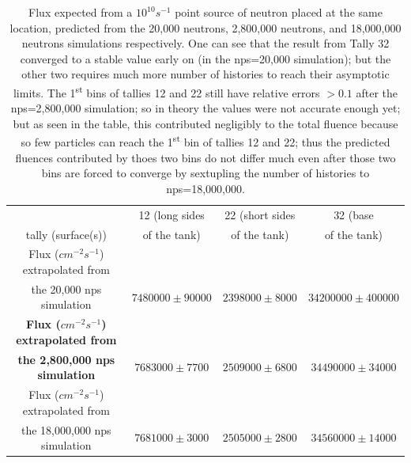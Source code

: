 \documentclass[a4paper, 11pt]{article}
\begin{document}
\begin{appendices}
\begin{table}[H]
	\centering
	\begin{tabular}{c|ccc}
						   & 12 (long sides & 22 (short sides & 32 (base    \\
		tally (surface(s)) &  of the tank) & of the tank) & of the tank)	\\
		\hline
		Flux (${cm}^{-2}s^{-1}$) extrapolated from \\
		the 20,000 nps simulation & $7480000 \pm 90000$ & $2398000 \pm 8000$ & $34200000 \pm 400000$ \\
		\hline
		\textbf{Flux (${cm}^{-2}s^{-1}$) extrapolated from } \\
		\textbf{the 2,800,000 nps simulation} & $7683000\pm7700$& $2509000\pm6800$ & $34490000\pm34000$ \\
		\hline
		Flux (${cm}^{-2}s^{-1}$) extrapolated from \\
		the 18,000,000 nps simulation & $7681000\pm 3000$ & $2505000\pm 2800$ & $34560000\pm 14000$ 
	\end{tabular}
	\caption{Flux expected from a $10^{10} s^{-1}$ point source of neutron placed at the same location, predicted from the 20,000 neutrons, 2,800,000 neutrons, and 18,000,000 neutrons simulations respectively.
	One can see that the result from Tally 32 converged to a stable value early on (in the nps=20,000 simulation); but the other two requires much more number of histories to reach their asymptotic limits. The 1\textsuperscript{st} bins of tallies 12 and 22 still have relative errors $>0.1$ after the nps=2,800,000 simulation; so in theory the values were not accurate enough yet; but as seen in the table, this contributed negligibly to the total fluence because so few particles can reach the 1\textsuperscript{st} bin of tallies 12 and 22; thus the predicted fluences contributed by thoes two bins do not differ much even after those two bins are forced to converge by sextupling the number of histories to nps=18,000,000.
	}\label{Ex1FluxCalc}
\end{table}


\end{appendices}
\end{document}
